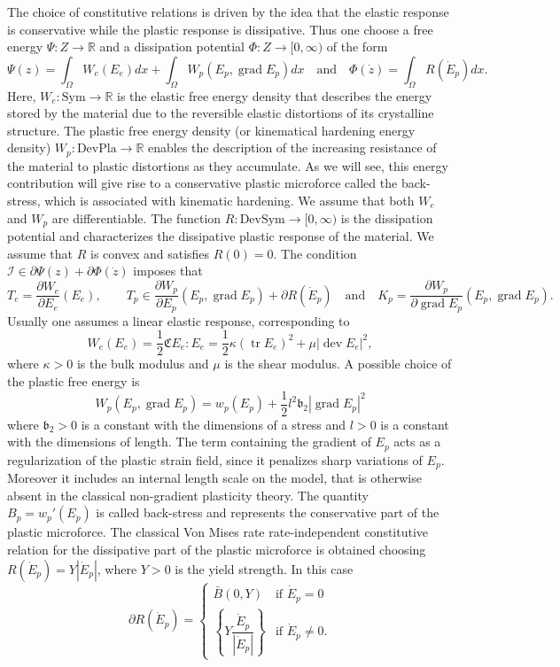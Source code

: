 \documentclass[a4paper,10pt,oneside]{amsbook}
\numberwithin{section}{chapter}
\numberwithin{equation}{chapter}
\theoremstyle{definition}
\DeclareMathOperator{\dev}{dev}
\DeclareMathOperator{\tr}{tr}
\DeclareMathOperator{\grad}{grad}
\newcommand{\dind}[2]{\frac{\partial #1}{\partial #2}}
\begin{document}
The choice of constitutive relations is driven by the idea that the elastic response is conservative while the plastic response is dissipative. Thus one choose a free energy $\Psi\colon Z\to\mathbb{R}$ and a dissipation potential $\Phi\colon Z\to[0,\infty)$ of the form
\[
\Psi(z)=\int_\Omega W_e(E_e)dx+\int_\Omega W_p(E_p,\grad E_p)dx\quad\text{and}\quad\Phi(\dot z)=\int_\Omega R(\dot E_p)dx.
\]
Here, $W_e\colon\text{Sym}\to\mathbb{R}$ is the elastic free energy density that describes the energy stored by the material due to the reversible elastic distortions of its crystalline structure. The plastic free energy density (or kinematical hardening energy density) $W_p\colon\text{DevPla}\to\mathbb{R}$ enables the description of the increasing resistance of the material to plastic distortions as they accumulate. As we will see, this energy contribution will give rise to a conservative plastic microforce called the back-stress, which is associated with kinematic hardening. We assume that both $W_e$ and $W_p$ are differentiable. The function $R\colon\text{DevSym}\to[0,\infty)$ is the dissipation potential and characterizes the dissipative plastic response of the material. We assume that $R$ is convex and satisfies $R(0)=0$. The condition $\mathcal{I}\in\partial\Psi(z)+\partial\Phi(\dot z)$ imposes that
\[
T_e=\dind{W_e}{E_e}(E_e),\qquad T_p\in\dind{W_p}{E_p}(E_p,\grad E_p)+\partial R(\dot E_p)\quad\text{and}\quad K_p=\dind{W_p}{\grad E_p}(E_p,\grad E_p).
\]
Usually one assumes a linear elastic response, corresponding to
\[
W_e(E_e)=\frac{1}{2}\mathfrak{C}E_e:E_e=\frac{1}{2}\kappa(\tr E_e)^2+\mu|\dev E_e|^2,
\]
where $\kappa>0$ is the bulk modulus and $\mu$ is the shear modulus. A possible choice of the plastic free energy is
\[
W_p(E_p,\grad E_p)=w_p(E_p)+\frac{1}{2}l^2\mathfrak{b}_2|\grad E_p|^2
\]
where $\mathfrak{b}_2>0$ is a constant with the dimensions of a stress and $l>0$ is a constant with the dimensions of length. The term containing the gradient of $E_p$ acts as a regularization of the plastic strain field, since it penalizes sharp variations of $E_p$. Moreover it includes an internal length scale on the model, that is otherwise absent in the classical non-gradient plasticity theory. The quantity $B_p=w_p'(E_p)$ is called back-stress and represents the conservative part of the plastic microforce. The classical Von Mises rate rate-independent constitutive relation for the dissipative part of the plastic microforce is obtained choosing $R(\dot E_p)=Y|\dot E_p|$, where $Y>0$ is the yield strength. In this case
\[
\partial R(\dot E_p)=
\begin{cases}
\bar B(0,Y) & \text{if $\dot E_p=0$} \\
\left\{Y\dfrac{\dot E_p}{|\dot E_p|}\right\} & \text{if $\dot E_p\neq0$}.
\end{cases}
\]
\end{document}
